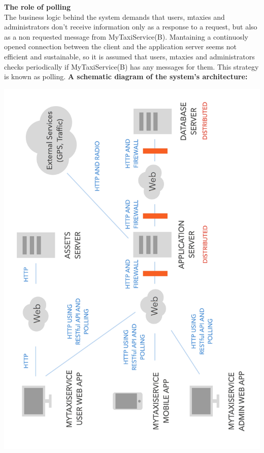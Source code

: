 \documentclass[11pt,titlepage]{article} %
\begin{document}
        \noindent \textbf{The role of polling}\hfill \\
        The business logic behind the system demands that users, mtaxies and administrators don't  receive information only as a response to a request, but
        also as a non requested message from MyTaxiService(B). Mantaining a continuosly opened connection between the client and the application server
        seems not efficient and sustainable, so it is assumed that users, mtaxies and administrators checks periodically if MyTaxiService(B) has any messages
        for them. This strategy is known as polling.\newline
        \newpage
        \textbf{A schematic diagram of the system's architecture:}\newline
        \hfill \\
       \centerline{ \includegraphics[scale=0.195]{Arch.jpg}}
 
\end{document}
